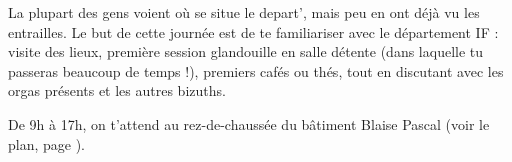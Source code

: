 La plupart des gens voient où se situe le depart', mais peu en ont déjà
vu les entrailles. Le but de cette journée est de te familiariser avec le
département IF : visite des lieux, première session glandouille en salle
détente (dans laquelle tu passeras beaucoup de temps !), premiers cafés ou
thés, tout en discutant avec les orgas présents et les autres bizuths.

\vspace{1em}

De 9h à 17h, on t'attend au rez-de-chaussée du bâtiment Blaise Pascal
(voir le plan, page \pageref{plan}).
